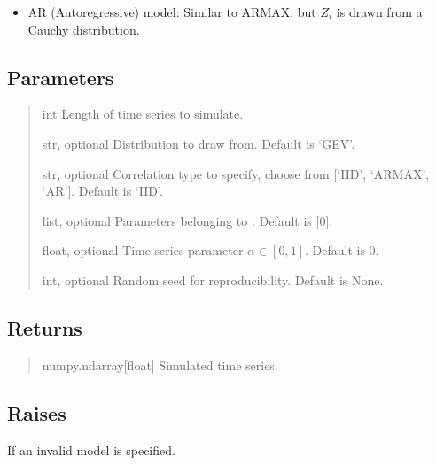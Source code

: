 \documentclass[a4paper,11pt,openany,english]{sphinxmanual}
\begin{document}
\begin{fulllineitems}
\begin{itemize}
\begin{description}
\begin{itemize}
\item {} 
\sphinxAtStartPar
AR (Autoregressive) model: Similar to ARMAX, but \(Z_i\) is drawn from a Cauchy distribution.

\end{itemize}

\end{description}

\end{itemize}


\subsection{Parameters}
\label{\detokenize{api_misc:id33}}\begin{quote}\begin{description}
\sphinxAtStartPar
int
Length of time series to simulate.

\sphinxAtStartPar
str, optional
Distribution to draw from. Default is ‘GEV’.

\sphinxAtStartPar
str, optional
Correlation type to specify, choose from {[}‘IID’, ‘ARMAX’, ‘AR’{]}. Default is ‘IID’.

\sphinxAtStartPar
list, optional
Parameters belonging to . Default is {[}0{]}.

\sphinxAtStartPar
float, optional
Time series parameter \(\alpha\in[0,1]\). Default is 0.

\sphinxAtStartPar
int, optional
Random seed for reproducibility. Default is None.

\end{description}\end{quote}


\subsection{Returns}
\label{\detokenize{api_misc:id34}}\begin{quote}\begin{description}
\sphinxAtStartPar
numpy.ndarray{[}float{]}
Simulated time series.

\end{description}\end{quote}


\subsection{Raises}
\label{\detokenize{api_misc:id35}}\begin{description}
\sphinxAtStartPar
If an invalid model is specified.


\end{description}
\end{fulllineitems}
\end{document}
